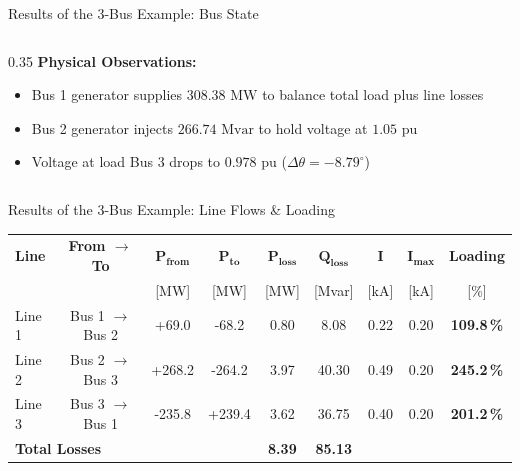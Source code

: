 \begin{frame}{Results of the 3-Bus Example: Bus State}
\begin{columns}
\begin{column}{0.35\textwidth}
            \textbf{Physical Observations:}
            \begin{itemize}
                \item Bus 1 generator supplies $308.38\text{ MW}$ to balance total load plus line losses
                \item Bus 2 generator injects $266.74\text{ Mvar}$ to hold voltage at $1.05\text{ pu}$
                \item Voltage at load Bus 3 drops to $0.978\text{ pu}$ ($\Delta \theta = -8.79^\circ$)
            \end{itemize}
        \end{column}
    \end{columns}
\end{frame}

\begin{frame}{Results of the 3-Bus Example: Line Flows \& Loading}
    \begin{table}[h]
        \centering
        \scriptsize
        \setlength{\tabcolsep}{4pt}
        \begin{tabular}{lcccccccc}
            \toprule
            \textbf{Line} & \textbf{From $\to$ To} & $\mathbf{P_{\text{from}}}$ & $\mathbf{P_{\text{to}}}$ & $\mathbf{P_{\text{loss}}}$ & $\mathbf{Q_{\text{loss}}}$ & $\mathbf{I}$ & $\mathbf{I_{\max}}$ & \textbf{Loading} \\
            & & [MW] & [MW] & [MW] & [Mvar] & [kA] & [kA] & [\%] \\
            \midrule
            Line 1 & Bus 1 $\to$ Bus 2 & +69.0 & -68.2 & 0.80 & 8.08 & 0.22 & 0.20 & \color{orange!90!black}\textbf{109.8\,\%} \\
            Line 2 & Bus 2 $\to$ Bus 3 & +268.2 & -264.2 & 3.97 & 40.30 & 0.49 & 0.20 & \color{red}\textbf{245.2\,\%} \\
            Line 3 & Bus 3 $\to$ Bus 1 & -235.8 & +239.4 & 3.62 & 36.75 & 0.40 & 0.20 & \color{red}\textbf{201.2\,\%} \\
            \midrule
            \multicolumn{2}{l}{\textbf{Total Losses}} & & & \textbf{8.39} & \textbf{85.13} & & & \\
            \bottomrule
        \end{tabular}
    \end{table}


\end{frame}
